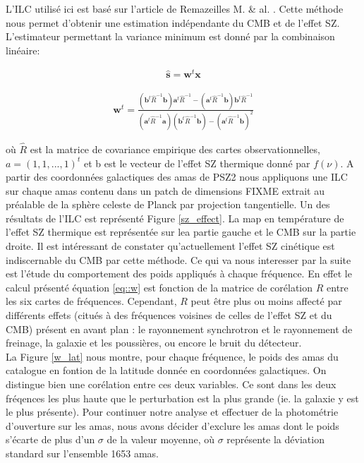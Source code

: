 \documentclass[a4paper,11pt]{article}
\begin{document}
L'ILC utilisé ici est basé sur l'article de Remazeilles M. \&
al. \cite{Remazeilles}. Cette méthode nous permet d'obtenir  une
estimation indépendante du CMB et de l'effet SZ. L'estimateur
permettant la variance minimum est donné par la combinaison linéaire: 

\begin{align*}
  \widehat{\textbf{s}} = \textbf{w}^t \textbf{x}
\end{align*}

\begin{align}
  \label{eq::w}
  \textbf{w}^t = \frac{\left( \textbf{b}^t\widehat{R}^{-1} \textbf{b}
    \right) \textbf{a}^t \widehat{R}^{-1} - \left( \textbf{a}^t\widehat{R}^{-1} \textbf{b}
    \right) \textbf{b}^t \widehat{R}^{-1}}{\left( \textbf{a}^t\widehat{R}^{-1} \textbf{a}
    \right) \left( \textbf{b}^t\widehat{R}^{-1} \textbf{b}
    \right) - \left( \textbf{a}^t\widehat{R}^{-1} \textbf{b}
    \right)^2}
\end{align}

où $\widehat{R}$ est la matrice de covariance empirique des cartes
observationnelles, $a = (1, 1, ..., 1)^t$ et b est le vecteur de
l'effet SZ thermique donné par $f(\nu)$. A partir des coordonnées
galactiques des amas de PSZ2 nous appliquons une ILC sur chaque amas
contenu dans un patch de dimensions FIXME  extrait au préalable de la sphère celeste de Planck par
projection tangentielle. 
Un des résultats de l'ILC est représenté Figure \ref{sz_effect}. La
map en température de l'effet SZ thermique est représentée sur lea
partie gauche et le CMB sur la partie droite. Il est intéressant de
constater qu'actuellement l'effet SZ cinétique est indiscernable du
CMB par cette méthode.  
Ce qui va nous interesser par la suite est l'étude du comportement des
poids appliqués à chaque fréquence. En effet le calcul présenté
équation \eqref{eq::w} est fonction de la matrice de corélation $R$ entre
les six cartes de fréquences. Cependant, $R$ peut être plus ou moins affecté par
différents effets (citués à des fréquences voisines de celles de l'effet SZ et
du CMB) présent en avant plan : le rayonnement synchrotron et le
rayonnement de freinage, la galaxie et les poussières, ou encore le bruit du
détecteur.  \\

La Figure \ref{w_lat} nous montre, pour chaque fréquence, le poids
des amas du catalogue en fontion de la latitude donnée en coordonnées
galactiques. On distingue bien une corélation entre ces deux
variables. Ce sont dans les deux fréqences les plus haute que le
perturbation est la plus grande (ie. la galaxie y est le plus
présente). Pour continuer notre analyse et effectuer de la photométrie
d'ouverture sur les amas, nous avons décider d'exclure les amas dont
le poids s'écarte de plus d'un $\sigma$ de la valeur moyenne, où
$\sigma$ représente la déviation standard sur l'ensemble 1653 amas. \\
\end{document}
